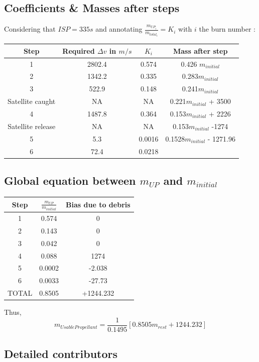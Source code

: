 \subsection{Coefficients \& Masses after steps}

Considering that \(ISP = 335s\) and annotating
\(\frac{m_{UP_i}}{m_{total_i}} = K_i\) with \(i\) the burn number :

\begin{longtable}[]{@{}cccc@{}}
\toprule
Step & Required \(\Delta v\) in \(m/s\) & \(K_i\) & Mass after
step\tabularnewline
\midrule
\endhead
1 & 2802.4 & 0.574 & 0.426 \(m_{initial}\)\tabularnewline
2 & 1342.2 & 0.335 & 0.283\(m_{initial}\)\tabularnewline
3 & 522.9 & 0.148 & 0.241\(m_{initial}\)\tabularnewline
Satellite caught & NA & NA & 0.221\(m_{initial}\) + 3500\tabularnewline
4 & 1487.8 & 0.364 & 0.153\(m_{initial}\) + 2226\tabularnewline
Satellite release & NA & NA & 0.153\(m_{initial}\) -1274\tabularnewline
5 & 5.3 & 0.0016 & 0.1528\(m_{initial}\) - 1271.96\tabularnewline
6 & 72.4 & 0.0218 &\tabularnewline
\bottomrule
\end{longtable}

\hypertarget{header-n470}{%
\subsection{\texorpdfstring{Global equation between \(m_{UP}\) and
		\(m_{initial}\)}{Global equation between m\_\{UP\} and m\_\{initial\}}}\label{header-n470}}



\begin{longtable}[]{@{}ccc@{}}
\toprule
Step & \(\frac{m_{UP}}{m_{initial}}\) & Bias due to
debris\tabularnewline
\midrule
\endhead
1 & 0.574 & 0\tabularnewline
2 & 0.143 & 0\tabularnewline
3 & 0.042 & 0\tabularnewline
4 & 0.088 & 1274\tabularnewline
5 & 0.0002 & -2.038\tabularnewline
6 & 0.0033 & -27.73\tabularnewline
TOTAL & 0.8505 & +1244.232\tabularnewline
\bottomrule
\end{longtable}
Thus,
$$
m_{UsablePropellant} = \frac 1{0.1495}[0.8505m_{rest}+1244.232]
$$
\subsection{Detailed contributors}
